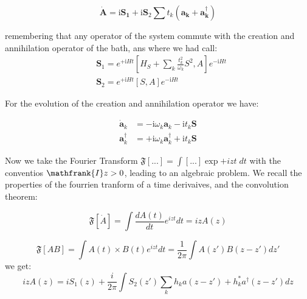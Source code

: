 \documentclass[%
preprint,
onecolumn,
notitlepag,
 amsmath,amssymb,
 aps,
 pra,
]{revtex4-2}
\begin{document}
\begin{equation}
\dot{\boldsymbol{A}}=\mathrm{i} \boldsymbol{S}_{\mathbf{1}}+\mathrm{i} \boldsymbol{S}_{2} \sum t_{k}\left(\boldsymbol{a}_{\boldsymbol{k}}+\boldsymbol{a}_{\boldsymbol{k}}^{\dagger}\right)
\end{equation}


remembering that any operator of the system commute with the creation and annihilation operator of the bath, ans where we had call: 
\begin{equation}
\begin{aligned}
&\boldsymbol{S}_{1}=e^{+\mathrm{i} H t}\left[H_{S}+\sum_{k} \frac{t_{k}^{2}}{\omega_{k}} S^{2}, A\right] e^{-\mathrm{i} H t} \\
&\boldsymbol{S}_{2}=e^{+\mathrm{i} H t}[S, A] e^{-\mathrm{i} H t}
\end{aligned}
\end{equation}



For the evolution of the creation and annihilation operator we have:



\begin{equation}
\begin{aligned}
\dot{\boldsymbol{a}}_{k} &=-\mathrm{i} \omega_{k} \boldsymbol{a}_{k}-\mathrm{i} t_{k} \boldsymbol{S} \\
\boldsymbol{a}_{k}^{\dagger} &=+\mathrm{i} \omega_{k} \boldsymbol{a}_{k}^{\dagger}+\mathrm{i} t_{k} \boldsymbol{S}
\end{aligned}
\end{equation}


Now we take the Fourier Transform $\mathfrak{F} [...] = \int [...] \exp{+izt} \; dt $ with the conventios $\mathfrank{I} z > 0 $, leading to an algebraic problem. We recall the properties of the fourrien tranform of a time derivaives, and the convolution theorem: 

\begin{equation}
\mathfrak{F} [\dot{A}]   =   \int \frac{dA(t)}{d t}  e^{izt} dt =iz A(z)
\end{equation}

\begin{equation}
 \mathfrak{F} [AB] =   \int A(t) \times B(t) e^{izt} dt = \frac{1}{2\pi} \int A(z') B(z-z') dz'
\end{equation}
we get:
\begin{equation}
izA(z)= i S_1 (z) + \frac{i}{2\pi} \int S_2(z') \sum_k h_k a(z-z')+ h_k^* a^{\dagger} (z-z') dz
\label{evolution operator FT}
\end{equation}
\end{document}
